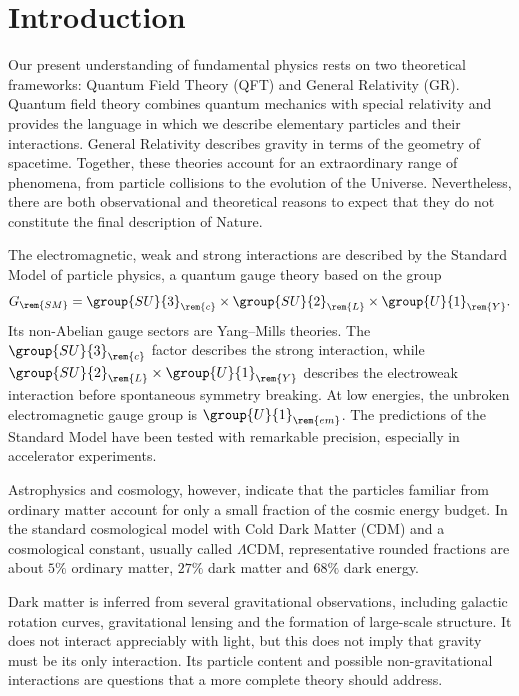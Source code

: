 
\chapter{Introduction}
Our present understanding of fundamental physics rests on two theoretical frameworks: Quantum Field Theory (QFT) and General Relativity (GR). Quantum field theory combines quantum mechanics with special relativity and provides the language in which we describe elementary particles and their interactions. General Relativity describes gravity in terms of the geometry of spacetime. Together, these theories account for an extraordinary range of phenomena, from particle collisions to the evolution of the Universe. Nevertheless, there are both observational and theoretical reasons to expect that they do not constitute the final description of Nature.

The electromagnetic, weak and strong interactions are described by the Standard Model of particle physics, a quantum gauge theory based on the group
\begin{equation}
    G_{\rem{SM}} = \group{SU}{3}_{\rem{c}} \times \group{SU}{2}_{\rem{L}} \times \group{U}{1}_{\rem{Y}}.
\end{equation}
Its non-Abelian gauge sectors are Yang--Mills theories. The $\group{SU}{3}_{\rem{c}}$ factor describes the strong interaction, while $\group{SU}{2}_{\rem{L}} \times \group{U}{1}_{\rem{Y}}$ describes the electroweak interaction before spontaneous symmetry breaking. At low energies, the unbroken electromagnetic gauge group is $\group{U}{1}_{\rem{em}}$. The predictions of the Standard Model have been tested with remarkable precision, especially in accelerator experiments.

Astrophysics and cosmology, however, indicate that the particles familiar from ordinary matter account for only a small fraction of the cosmic energy budget. In the standard cosmological model with Cold Dark Matter (CDM) and a cosmological constant, usually called $\Lambda$CDM, representative rounded fractions are about $5\%$ ordinary matter, $27\%$ dark matter and $68\%$ dark energy.

Dark matter is inferred from several gravitational observations, including galactic rotation curves, gravitational lensing and the formation of large-scale structure. It does not interact appreciably with light, but this does not imply that gravity must be its only interaction. Its particle content and possible non-gravitational interactions are questions that a more complete theory should address.

